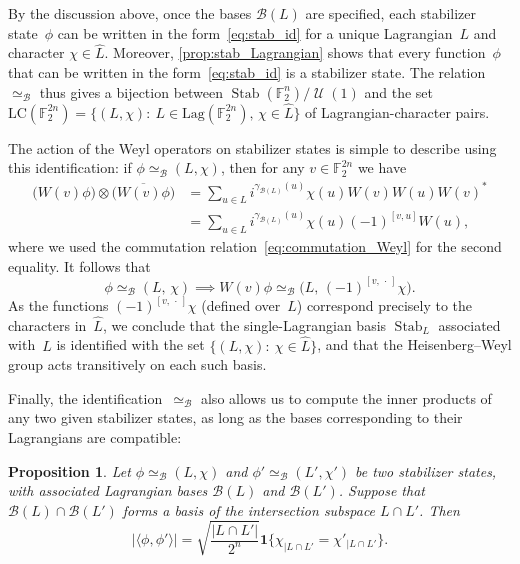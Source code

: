\documentclass[11pt]{amsart}
\newcommand{\Lag}{\mathrm{Lag}}
\DeclareMathOperator{\Stab}{Stab}\DeclareMathOperator{\Spec}{Spec}
\newcommand{\F}{\mathbb{F}} %
\newcommand{\one}{\mathbf{1}}
\DeclareMathOperator{\U}{\mathcal{U}}
\newcommand{\B}{\mathcal B}
\theoremstyle{plain}
\newtheorem{proposition}[theorem]{Proposition}
\theoremstyle{definition}
\theoremstyle{remark}
\begin{document}
By the discussion above, once the bases $\B(L)$ are specified, each stabilizer state~$\phi$ can be written in the form~\eqref{eq:stab_id} for a unique Lagrangian~$L$ and character $\chi \in \widehat{L}$.
Moreover, \cref{prop:stab_Lagrangian} shows that every function~$\phi$ that can be written in the form~\eqref{eq:stab_id} is a stabilizer state.
The relation~$\simeq_\B$ thus gives a bijection between $\Stab(\F_2^n)/\U(1)$ and the set
$\mathrm{LC}(\F_2^{2n}) = \big\{(L, \chi):\: L\in \Lag(\F_2^{2n}),\, \chi\in \widehat{L}\big\}$
of Lagrangian-character pairs.

The action of the Weyl operators on stabilizer states is simple to describe using this identification:
if $\phi \simeq_\B (L,\chi)$, then for any $v\in \F_2^{2n}$ we have
\begin{align*}
    \big(W(v)\phi\big)\otimes \overline{\big(W(v)\phi\big)}
    &=
    \sum_{u\in L} i^{\gamma_{\B(L)}(u)} \chi(u) W(v)W(u)W(v)^*\\
    &=
    \sum_{u\in L} i^{\gamma_{\B(L)}(u)} \chi(u)(-1)^{[v,u]} W(u),
\end{align*}
where we used the commutation relation~\eqref{eq:commutation_Weyl} for the second equality.
It follows that
\begin{equation} \label{eq:Weyl_action}
    \phi \simeq_\B (L,\, \chi) \implies W(v)\phi \simeq_\B \big(L,\, (-1)^{[v, \,\cdot\,]}\chi \big).
\end{equation}
As the functions $(-1)^{[v, \,\cdot\,]}\chi$ (defined over~$L$) correspond precisely to the characters in~$\widehat{L}$, we conclude that the single-Lagrangian basis $\Stab_L$ associated with~$L$ is identified with the set $\{(L, \chi):\: \chi\in \widehat{L}\}$, and that the Heisenberg--Weyl group acts transitively on each such basis.

Finally, the identification~$\simeq_\B$ also allows us to compute the inner products of any two given stabilizer states, as long as the bases corresponding to their Lagrangians are compatible:

\begin{proposition} \label{prop:inner_product_intersection}
    Let $\phi \simeq_\B (L, \chi)$ and $\phi' \simeq_\B (L', \chi')$ be two stabilizer states, with associated Lagrangian bases $\B(L)$ and $\B(L')$.
    Suppose that $\B(L) \cap \B(L')$ forms a basis of the intersection subspace $L\cap L'$.
    Then
    \begin{equation} \label{eq:intersection}
    |\langle\phi, \phi'\rangle| = \sqrt{\frac{|L\cap L'|}{2^n}} \one\{\chi_{|L\cap L'} = \chi'_{|L\cap L'}\}.
\end{equation}
\end{proposition}
\end{document}
